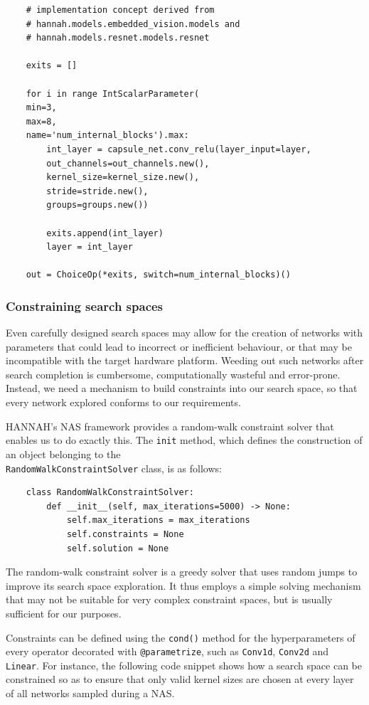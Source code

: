 \documentclass[11pt,a4paper, open=any]{scrbook}
\newcounter{constraint}[chapter]
\newcommand{\py}[1]{\texttt{#1}}
\begin{document}
\begin{verbatim}
	# implementation concept derived from 
	# hannah.models.embedded_vision.models and   
	# hannah.models.resnet.models.resnet
	
	exits = []
	
	for i in range IntScalarParameter(
	min=3,
	max=8, 
	name='num_internal_blocks').max:
		int_layer = capsule_net.conv_relu(layer_input=layer,
		out_channels=out_channels.new(),
		kernel_size=kernel_size.new(),
		stride=stride.new(),
		groups=groups.new())
	
		exits.append(int_layer)
		layer = int_layer
	
	out = ChoiceOp(*exits, switch=num_internal_blocks)()
\end{verbatim}
\subsubsection{Constraining search spaces}\label{subsec:con}
Even carefully designed search spaces may allow for the creation of networks with parameters that could lead to incorrect or inefficient behaviour, or that may be incompatible with the target hardware platform. Weeding out such networks after search completion is cumbersome, computationally wasteful and error-prone. Instead, we need a mechanism to build constraints into our search space, so that every network explored conforms to our requirements.

HANNAH's NAS framework provides a random-walk constraint solver that enables us to do exactly this. The \py{init} method, which defines the construction of an object belonging to the\\ \py{RandomWalkConstraintSolver} class, is as follows:

\begin{verbatim}
	class RandomWalkConstraintSolver:
		def __init__(self, max_iterations=5000) -> None:
			self.max_iterations = max_iterations
			self.constraints = None
			self.solution = None
\end{verbatim}

The random-walk constraint solver is a greedy solver that uses random jumps to improve its search space exploration. It thus employs a simple solving mechanism that may not be suitable for very complex constraint spaces, but is usually sufficient for our purposes.

Constraints can be defined using the \py{cond()} method for the hyperparameters of every operator decorated with \py{@parametrize}, such as \py{Conv1d}, \py{Conv2d} and \py{Linear}. For instance, the following code snippet shows how a search space can be constrained so as to ensure that only valid kernel sizes are chosen at every layer of all networks sampled during a NAS.
\end{document}
